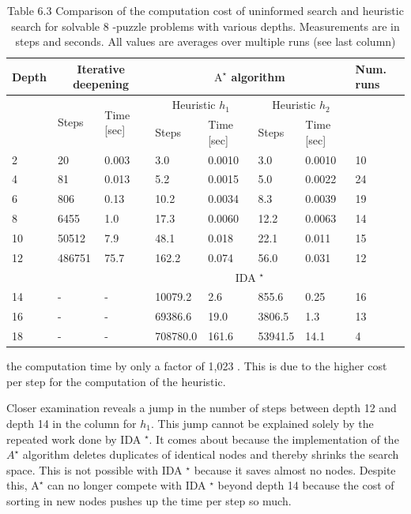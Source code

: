 \documentclass[10pt]{article}
\begin{document}
\begin{table}[h]
\begin{center}
\captionsetup{labelformat=empty}
\caption{Table 6.3 Comparison of the computation cost of uninformed search and heuristic search for solvable 8 -puzzle problems with various depths. Measurements are in steps and seconds. All values are averages over multiple runs (see last column)}
\begin{tabular}{|l|l|l|l|l|l|l|l|}
\hline
\multirow[t]{3}{*}{Depth} & \multicolumn{2}{|c|}{Iterative deepening} & \multicolumn{4}{|c|}{$\mathrm{A}^{\star}$ algorithm} & \multirow[t]{3}{*}{Num. runs} \\
\hline
 & \multirow[t]{2}{*}{Steps} & \multirow{2}{*}{Time [sec]} & \multicolumn{2}{|c|}{Heuristic $h_{1}$} & \multicolumn{2}{|c|}{Heuristic $h_{2}$} &  \\
\hline
 &  &  & Steps & Time [sec] & Steps & Time [sec] &  \\
\hline
2 & 20 & 0.003 & 3.0 & 0.0010 & 3.0 & 0.0010 & 10 \\
\hline
4 & 81 & 0.013 & 5.2 & 0.0015 & 5.0 & 0.0022 & 24 \\
\hline
6 & 806 & 0.13 & 10.2 & 0.0034 & 8.3 & 0.0039 & 19 \\
\hline
8 & 6455 & 1.0 & 17.3 & 0.0060 & 12.2 & 0.0063 & 14 \\
\hline
10 & 50512 & 7.9 & 48.1 & 0.018 & 22.1 & 0.011 & 15 \\
\hline
12 & 486751 & 75.7 & 162.2 & 0.074 & 56.0 & 0.031 & 12 \\
\hline
 &  &  & \multicolumn{4}{|c|}{IDA ${ }^{\star}$} &  \\
\hline
14 & - & - & 10079.2 & 2.6 & 855.6 & 0.25 & 16 \\
\hline
16 & - & - & 69386.6 & 19.0 & 3806.5 & 1.3 & 13 \\
\hline
18 & - & - & 708780.0 & 161.6 & 53941.5 & 14.1 & 4 \\
\hline
\end{tabular}
\end{center}
\end{table}

the computation time by only a factor of 1,023 . This is due to the higher cost per step for the computation of the heuristic.

Closer examination reveals a jump in the number of steps between depth 12 and depth 14 in the column for $h_{1}$. This jump cannot be explained solely by the repeated work done by IDA ${ }^{\star}$. It comes about because the implementation of the $A^{\star}$ algorithm deletes duplicates of identical nodes and thereby shrinks the search space. This is not possible with IDA ${ }^{\star}$ because it saves almost no nodes. Despite this, $\mathrm{A}^{\star}$ can no longer compete with IDA ${ }^{\star}$ beyond depth 14 because the cost of sorting in new nodes pushes up the time per step so much.
\end{document}
